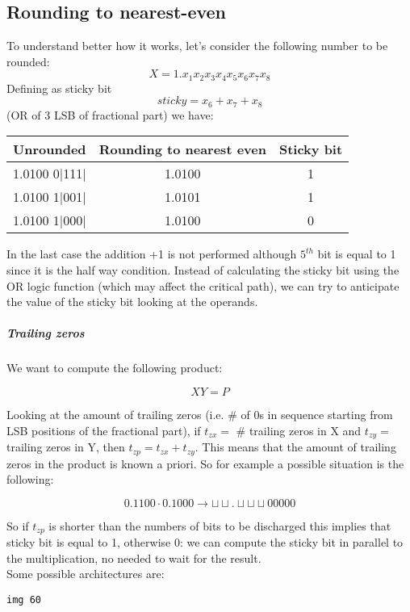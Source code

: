 \subsection{Rounding to nearest-even}
To understand better how it works, let's consider the following number to be rounded:
$$X=1.x_1 x_2 x_3 x_4 x_5 x_6 x_7 x_8$$
Defining as sticky bit $$sticky= x_6 + x_7 + x_8$$ (OR of 3 LSB of fractional
part) we have:

\begin{center}
  \begin{tabular}{|c|c|c|}
    \hline
    Unrounded&  Rounding to nearest even& Sticky bit\\
    \hline
    1.0100 0|111|&  1.0100&         1\\
    1.0100 1|001|&  1.0101&         1\\
    1.0100 1|000|&  1.0100&         0\\
    \hline
  \end{tabular}
\end{center}

In the last case the addition +1 is not performed although $5^{th}$ bit is equal to 1 since it is the half way condition.
Instead of calculating the sticky bit using the OR logic function (which may affect the critical path), we can try to anticipate the value of the sticky bit looking at the operands.

\subparagraph{Trailing zeros}

We want to compute the following product:

$$XY=P$$

Looking at the amount of trailing zeros (i.e. \# of 0s in sequence starting
from LSB positions of the fractional part), if $t_{zx}=$ \# trailing zeros in X
and $t_{zy}=$ trailing zeros in Y, then $t_{zp}=t_{zx}+t_{zy}$. This
means that the amount of trailing zeros in the product is known a priori. So
for example a possible situation is the following:

$$ 0.1100 \cdot 0.1000 \longrightarrow  \sqcup \sqcup . \sqcup \sqcup \sqcup
00000
$$

So if $t_{zp}$ is shorter than the numbers of bits to be discharged this
implies that sticky bit is equal to 1, otherwise  0: we can compute the sticky
bit in parallel to the multiplication, no needed to wait for the result.\\

Some possible architectures are:

\begin{verbatim}
img 60
















\end{verbatim}

